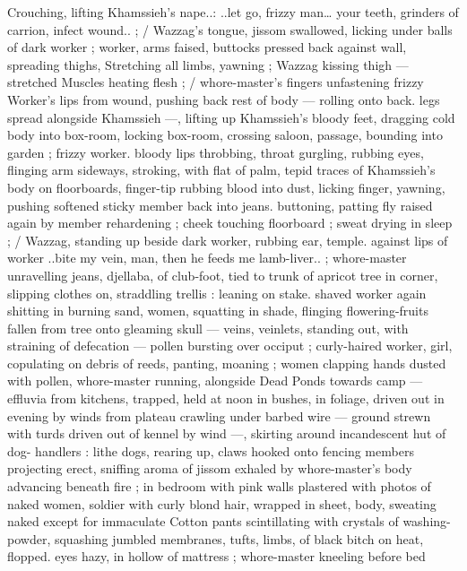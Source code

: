 Crouching, lifting Khamssieh's nape..: {\gl}..let go, frizzy man{\ldots} your 
teeth, grinders of carrion, infect wound..{\gr} ; {\slash} Wazzag's tongue, 
jissom swallowed, licking under balls of dark worker ; worker, arms 
faised, buttocks pressed back against wall, spreading thighs, 
Stretching all limbs, yawning ; Wazzag kissing thigh --- stretched 
Muscles heating flesh ; {\slash} whore-master's fingers unfastening frizzy 
Worker's lips from wound, pushing back rest of body --- rolling onto 
back. legs spread alongside Khamssieh ---, lifting up Khamssieh's 
bloody feet, dragging cold body into box-room, locking box-room, 
crossing saloon, passage, bounding into garden ; frizzy worker. 
bloody lips throbbing, throat gurgling, rubbing eyes, flinging arm 
sideways, stroking, with flat of palm, tepid traces of Khamssieh's 
body on floorboards, finger-tip rubbing blood into dust, licking 
finger, yawning, pushing softened sticky member back into jeans. 
buttoning, patting fly raised again by member rehardening ; cheek 
touching floorboard ; sweat drying in sleep ; {\slash} Wazzag, standing up 
beside dark worker, rubbing ear, temple. against lips of worker 
{\gl}..bite my vein, man, then he feeds me lamb-liver..{\gr} ; whore-master 
unravelling jeans, djellaba, of club-foot, tied to trunk of apricot tree 
in corner, slipping clothes on, straddling trellis : leaning on stake. 
shaved worker again shitting in burning sand, women, squatting in 
shade, flinging flowering-fruits fallen from tree onto gleaming skull 
--- veins, veinlets, standing out, with straining of defecation --- 
pollen bursting over occiput ; curly-haired worker, girl, copulating on 
debris of reeds, panting, moaning ; women clapping hands dusted 
with pollen, whore-master running, alongside {\gl} Dead Ponds {\gr} 
towards camp --- effluvia from kitchens, trapped, held at noon in 
bushes, in foliage, driven out in evening by winds from plateau 
crawling under barbed wire --- ground strewn with turds driven out 
of kennel by wind ---, skirting around incandescent hut of dog- 
handlers : lithe dogs, rearing up, claws hooked onto fencing 
members projecting erect, sniffing aroma of jissom exhaled by 
whore-master's body advancing beneath fire ; in bedroom with pink 
walls plastered with photos of naked women, soldier with curly blond 
hair, wrapped in sheet, body, sweating naked except for immaculate 
Cotton pants scintillating with crystals of washing-powder, squashing 
jumbled membranes, tufts, limbs, of black bitch on heat, flopped. 
eyes hazy, in hollow of mattress ; whore-master kneeling before bed 
